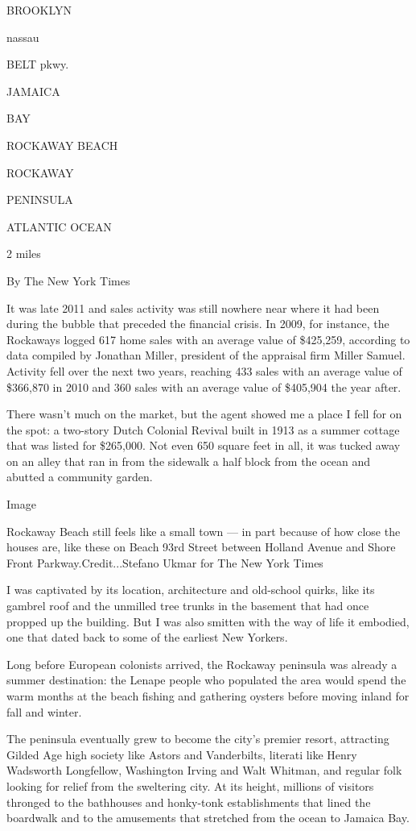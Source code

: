 BROOKLYN

nassau

BELT pkwy.

JAMAICA

BAY

ROCKAWAY BEACH

ROCKAWAY

PENINSULA

ATLANTIC OCEAN

2 miles

By The New York Times

It was late 2011 and sales activity was still nowhere near where it had
been during the bubble that preceded the financial crisis. In 2009, for
instance, the Rockaways logged 617 home sales with an average value of
\$425,259, according to data compiled by Jonathan Miller, president of
the appraisal firm Miller Samuel. Activity fell over the next two years,
reaching 433 sales with an average value of \$366,870 in 2010 and 360
sales with an average value of \$405,904 the year after.

There wasn't much on the market, but the agent showed me a place I fell
for on the spot: a two-story Dutch Colonial Revival built in 1913 as a
summer cottage that was listed for \$265,000. Not even 650 square feet
in all, it was tucked away on an alley that ran in from the sidewalk a
half block from the ocean and abutted a community garden.

Image

Rockaway Beach still feels like a small town --- in part because of how
close the houses are, like these on Beach 93rd Street between Holland
Avenue and Shore Front Parkway.Credit...Stefano Ukmar for The New York
Times

I was captivated by its location, architecture and old-school quirks,
like its gambrel roof and the unmilled tree trunks in the basement that
had once propped up the building. But I was also smitten with the way of
life it embodied, one that dated back to some of the earliest New
Yorkers.

Long before European colonists arrived, the Rockaway peninsula was
already a summer destination: the Lenape people who populated the area
would spend the warm months at the beach fishing and gathering oysters
before moving inland for fall and winter.

The peninsula eventually grew to become the city's premier resort,
attracting Gilded Age high society like Astors and Vanderbilts, literati
like Henry Wadsworth Longfellow, Washington Irving and Walt Whitman, and
regular folk looking for relief from the sweltering city. At its height,
millions of visitors thronged to the bathhouses and honky-tonk
establishments that lined the boardwalk and to the amusements that
stretched from the ocean to Jamaica Bay.

